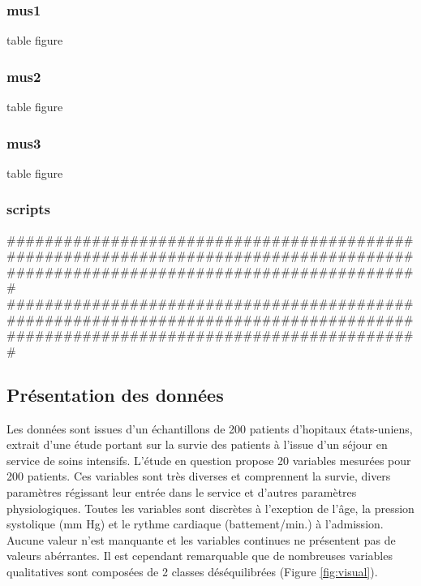 \documentclass[10pt,a4paper,notitlepage,colorinlistoftodos]{article}
\begin{document}
\subsubsection*{mus1}
table
figure
\subsubsection*{mus2}
table
figure
\subsubsection*{mus3}
table
figure

\subsubsection*{scripts}


\iffalse
##################################################################################################################################
%
##################################################################################################################################
\subsection*{Présentation des données}


Les données sont issues d'un échantillons de 200 patients d'hopitaux états-uniens, extrait d'une étude portant sur la survie des patients à l'issue d'un séjour en service de soins intensifs. L'étude en question propose 20 variables mesurées pour 200 patients. Ces variables sont très diverses et comprennent la survie, divers paramètres régissant leur entrée dans le service et d'autres paramètres physiologiques. Toutes les variables sont discrètes à l'exeption de l'âge, la pression systolique (mm Hg) et le rythme cardiaque (battement/min.) à l'admission. Aucune valeur n'est manquante et les variables continues ne présentent pas de valeurs abérrantes. Il est cependant remarquable que de nombreuses variables qualitatives sont composées de 2 classes déséquilibrées (Figure \ref{fig:visual}). 
\end{document}
